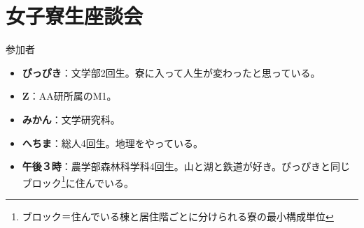\section{女子寮生座談会}

\newcommand{\talkerw}[1]{\noindent{\gtfamily \bfseries#1}:}

\begin{itembox}[m]{\LARGE 参加者}
    \begin{itemize}
        \item {\bfseries ぴっぴき}：文学部2回生。寮に入って人生が変わったと思っている。
        \item {\bfseries Z}：AA研所属のM1。
        \item {\bfseries みかん}：文学研究科。
        \item {\bfseries へちま}：総人4回生。地理をやっている。
        \item {\bfseries 午後３時}：農学部森林科学科4回生。山と湖と鉄道が好き。ぴっぴきと同じブロック\footnote{ブロック＝住んでいる棟と居住階ごとに分けられる寮の最小構成単位}に住んでいる。
    \end{itemize}
\end{itembox}

